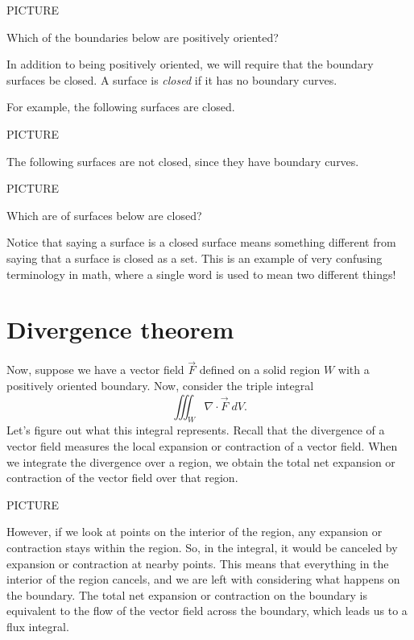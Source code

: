 \documentclass{ximera}
\begin{document}
PICTURE

\begin{example}
Which of the boundaries below are positively oriented?

\begin{multipleChoice}
\end{multipleChoice}
\end{example}

In addition to being positively oriented, we will require that the boundary surfaces be closed. A surface is \emph{closed} if it has no boundary curves.

For example, the following surfaces are closed.

PICTURE

The following surfaces are not closed, since they have boundary curves.

PICTURE

\begin{example}
Which are of surfaces below are closed?

\begin{multipleChoice}
\end{multipleChoice}
\end{example}

Notice that saying a surface is a closed surface means something different from saying that a surface is closed as a set. This is an example of very confusing terminology in math, where a single word is used to mean two different things!

\section*{Divergence theorem}

Now, suppose we have a vector field $\vec{F}$ defined on a solid region $W$ with a positively oriented boundary. Now, consider the triple integral
\[
\iiint_W \nabla\cdot \vec{F}\;dV.
\]
Let's figure out what this integral represents. Recall that the divergence of a vector field measures the local expansion or contraction of a vector field. When we integrate the divergence over a region, we obtain the total net expansion or contraction of the vector field over that region.

PICTURE

However, if we look at points on the interior of the region, any expansion or contraction stays within the region. So, in the integral, it would be canceled by expansion or contraction at nearby points. This means that everything in the interior of the region cancels, and we are left with considering what happens on the boundary. The total net expansion or contraction on the boundary is equivalent to the flow of the vector field across the boundary, which leads us to a flux integral.
\end{document}
